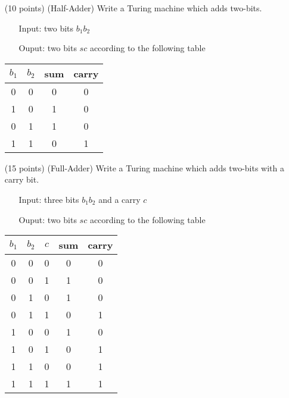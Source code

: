 \documentclass[11pt]{report}
\begin{document}
	\begin{enumerate}

		\item[(10 points)] (Half-Adder) Write a Turing machine which adds two-bits. 
		
			\begin{itemize}
				\item[] Input: two bits $b_{1}b_{2}$
				\item[] Ouput: two bits $sc$ according to the following table
			\end{itemize}

			\begin{center}
				\begin{tabular}{c c || c c }
					$b_{1}$ & $b_{2}$ & sum & carry \\
					\hline
					0 & 0 & 0 & 0 \\
					1 & 0 & 1 & 0 \\
					0 & 1 & 1 & 0 \\
					1 & 1 & 0 & 1
					
				\end{tabular}
			\end{center}

		\item[(15 points)] (Full-Adder) Write a Turing machine which adds two-bits with a carry bit.
		
			\begin{itemize}
				\item[] Input: three bits $b_{1}b_{2}$ and a carry $c$
				\item[] Ouput: two bits $sc$ according to the following table
			\end{itemize}

			\begin{center}
				\begin{tabular}{c c c || c c }
					$b_{1}$ & $b_{2}$ & $c$ & sum & carry \\
					\hline
					0 & 0 & 0 & 0 & 0 \\
					0 & 0 & 1 & 1 & 0 \\
					0 & 1 & 0 & 1 & 0 \\
					0 & 1 & 1 & 0 & 1 \\
					1 & 0 & 0 & 1 & 0 \\
					1 & 0 & 1 & 0 & 1 \\
					1 & 1 & 0 & 0 & 1 \\
					1 & 1 & 1 & 1 & 1 
					
				\end{tabular}
			\end{center}


\end{enumerate}
\end{document}
